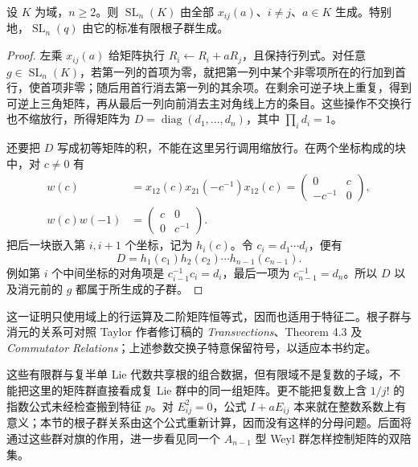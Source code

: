 \begin{proposition}\label{b5:prop:F-elementary-generation}
	设 \(K\) 为域，\(n\ge2\)。则 \(\operatorname{SL}_n(K)\) 由全部 \(x_{ij}(a)\)、\(i\ne j\)、\(a\in K\) 生成。特别地，\(\operatorname{SL}_n(q)\) 由它的标准有限根子群生成。
\end{proposition}
\begin{proof}
	左乘 \(x_{ij}(a)\) 给矩阵执行 \(R_i\leftarrow R_i+aR_j\)，且保持行列式。对任意 \(g\in\operatorname{SL}_n(K)\)，若第一列的首项为零，就把第一列中某个非零项所在的行加到首行，使首项非零；随后用首行消去第一列的其余项。在剩余可逆子块上重复，得到可逆上三角矩阵，再从最后一列向前消去主对角线上方的条目。这些操作不交换行也不缩放行，所得矩阵为 \(D=\operatorname{diag}(d_1,\ldots,d_n)\)，其中 \(\prod_i d_i=1\)。

	还要把 \(D\) 写成初等矩阵的积，不能在这里另行调用缩放行。在两个坐标构成的块中，对 \(c\ne0\) 有
	\[
		\begin{aligned}
			w(c)&=x_{12}(c)x_{21}(-c^{-1})x_{12}(c)
			=\begin{pmatrix}0&c\\-c^{-1}&0\end{pmatrix},\\
			w(c)w(-1)&=\begin{pmatrix}c&0\\0&c^{-1}\end{pmatrix}.
		\end{aligned}
	\]
	把后一块嵌入第 \(i,i+1\) 个坐标，记为 \(h_i(c)\)。令 \(c_i=d_1\cdots d_i\)，便有
	\[
		D=h_1(c_1)h_2(c_2)\cdots h_{n-1}(c_{n-1}).
	\]
	例如第 \(i\) 个中间坐标的对角项是 \(c_{i-1}^{-1}c_i=d_i\)，最后一项为 \(c_{n-1}^{-1}=d_n\)。所以 \(D\) 以及消元前的 \(g\) 都属于所生成的子群。
\end{proof}
这一证明只使用域上的行运算及二阶矩阵恒等式，因而也适用于特征二。根子群与消元的关系可对照 Taylor 作者修订稿的 \emph{Transvections}、Theorem 4.3 及 \emph{Commutator Relations}\cite[Chapter 4, pp.~20--22; Chapter 5, p.~34]{Taylor1992ClassicalGroups}；上述参数交换子特意保留符号，以适应本书约定。

\ProseParagraphBreak

这些有限群与复半单 Lie 代数共享根的组合数据，但有限域不是复数的子域，不能把这里的矩阵群直接看成复 Lie 群中的同一组矩阵。更不能把复数上含 \(1/j!\) 的指数公式未经检查搬到特征 \(p\)。对 \(E_{ij}^2=0\)，公式 \(I+aE_{ij}\) 本来就在整数系数上有意义；本节的根子群关系由这个公式重新计算，因而没有这样的分母问题。后面将通过这些群对旗的作用，进一步看见同一个 \(A_{n-1}\) 型 Weyl 群怎样控制矩阵的双陪集。
